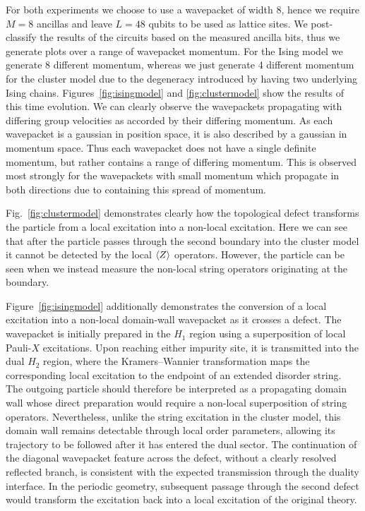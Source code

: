 \documentclass[aps,floatfix,10pt,amssymb,amsfont,amsmath,superscriptaddress,float,nofootinbib,longbibliography,nobalancelastpage,twocolumn,prx]{revtex4-2}
\begin{document}
For both experiments we choose to use a wavepacket of width 8, hence we require $M=8$ ancillas and leave $L=48$ qubits to be used as lattice sites. We post-classify the results of the circuits based on the measured ancilla bits, thus we generate plots over a range of wavepacket momentum. For the Ising model we generate 8 different momentum, whereas we just generate 4 different momentum for the cluster model due to the degeneracy introduced by having two underlying Ising chains. Figures~\ref{fig:isingmodel} and \ref{fig:clustermodel} show the results of this time evolution. We can clearly observe the wavepackets propagating with differing group velocities as accorded by their differing momentum. As each wavepacket is a gaussian in position space, it is also described by a gaussian in momentum space. Thus each wavepacket does not have a single definite momentum, but rather contains a range of differing momentum. This is observed most strongly for the wavepackets with small momentum which propagate in both directions due to containing this spread of momentum.


Fig.~\ref{fig:clustermodel} demonstrates clearly how the topological defect transforms the particle from a local excitation into a non-local excitation. Here we can see that after the particle passes through the second boundary into the cluster model it cannot be detected by the local $\braket{Z}$ operators. However, the particle can be seen when we instead measure the non-local string operators originating at the boundary.

Figure~\ref{fig:isingmodel} additionally demonstrates the conversion of a local excitation into a non-local domain-wall wavepacket as it crosses a defect. The wavepacket is initially prepared in the $H_1$ region using a superposition of local Pauli-$X$ excitations. Upon reaching either impurity site, it is transmitted into the dual $H_2$ region, where the Kramers--Wannier transformation maps the corresponding local excitation to the endpoint of an extended disorder string. The outgoing particle should therefore be interpreted as a propagating domain wall whose direct preparation would require a non-local superposition of string operators. Nevertheless, unlike the string excitation in the cluster model, this domain wall remains detectable through local order parameters, allowing its trajectory to be followed after it has entered the dual sector. The continuation of the diagonal wavepacket feature across the defect, without a clearly resolved reflected branch, is consistent with the expected transmission through the duality interface. In the periodic geometry, subsequent passage through the second defect would transform the excitation back into a local excitation of the original theory.
\end{document}
